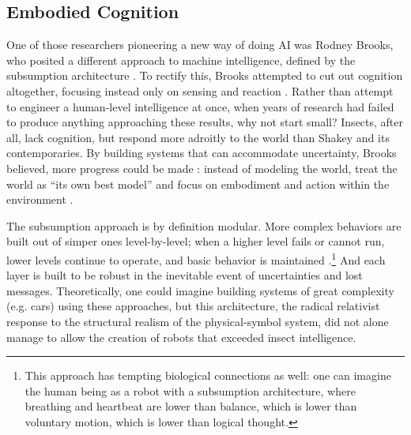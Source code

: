 \subsection{Embodied Cognition}


One of those researchers pioneering a new way of doing AI was Rodney
Brooks, who posited a different approach to machine
intelligence, defined by the subsumption architecture \cite[p.
  353]{mobilebrooks}.  To rectify this, Brooks attempted to cut out 
cognition altogether, focusing instead only on sensing and
reaction \cite[Afterword]{mccorduck}. Rather than attempt to engineer a
human-level intelligence at once, when years of research had failed to
produce anything approaching these results, why not start small?
Insects, after all, lack cognition, but respond more adroitly to the
world than Shakey and its contemporaries. By building systems that can
accommodate uncertainty, Brooks believed, more progress could be
made \cite[p. 347]{mobilebrooks}: instead of modeling the world, treat
the world as ``its own best model'' and focus on embodiment and action
within the environment \cite[p. 256]{ekbia}.


The subsumption approach is by definition modular. More complex behaviors
are built out of simper ones level-by-level; when a higher level fails or
cannot run, lower levels continue to operate, and basic behavior is
maintained \cite[p. 355]{mobilebrooks}.\footnote{This approach has tempting
biological connections as well: one can imagine the human being as a
robot with a subsumption 
architecture, where breathing and heartbeat are lower than balance,
which is lower than voluntary motion, which is lower than logical
thought.} And each layer is built to be robust in the inevitable
event of uncertainties and lost messages. Theoretically, one could
imagine building systems of great complexity (e.g. cars) using these approaches,
but this architecture, the radical relativist response to the
structural realism of the physical-symbol system, did not alone manage
to allow the creation of robots that exceeded insect intelligence.

